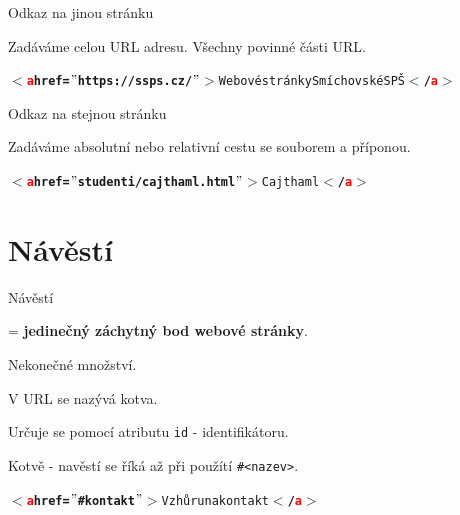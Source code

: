 \documentclass[aspectratio=1610]{beamer}
\begin{document}
\begin{frame}{Odkaz na jinou stránku}
    \begin{cardTiny}
        \begin{flushleft}
            Zadáváme celou URL adresu. Všechny povinné části URL.

            \begin{alltt}\textbf{$<$\textcolor{red}{a} href=$"$https://ssps.cz/$"$$>$}Webové stránky Smíchovské SPŠ\textbf{$<$/\textcolor{red}{a}$>$}\end{alltt}
        \end{flushleft}
    \end{cardTiny}
\end{frame}

\begin{frame}{Odkaz na stejnou stránku}
    \begin{cardTiny}
        \begin{flushleft}
            Zadáváme absolutní nebo relativní cestu se souborem a příponou.

            \begin{alltt}\textbf{$<$\textcolor{red}{a} href=$"$studenti/cajthaml.html$"$$>$}Cajthaml\textbf{$<$/\textcolor{red}{a}$>$}\end{alltt}
        \end{flushleft}
    \end{cardTiny}
\end{frame}


\section{Návěstí}

\begin{frame}{Návěstí}
    \begin{cardTiny}
        \begin{flushleft}
            = \textbf{jedinečný záchytný bod webové stránky}.

            Nekonečné množství.

            V URL se nazývá kotva.

            Určuje se pomocí atributu \texttt{id} - identifikátoru.

            Kotvě - navěstí se říká až při použítí \texttt{\#<nazev>}.

            \begin{alltt}\textbf{$<$\textcolor{red}{a} href=$"$\#kontakt$"$$>$}Vzhůru na kontakt\textbf{$<$/\textcolor{red}{a}$>$}\end{alltt}
        \end{flushleft}
    \end{cardTiny}
\end{frame}
\end{document}
